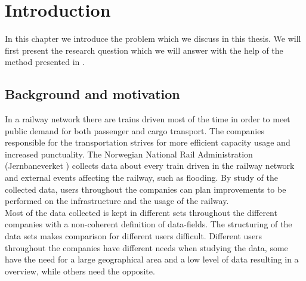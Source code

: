 
\chapter{Introduction}
\label{chapter:introduction}


In this chapter we introduce the problem which we discuss in this thesis.
We will first present the research question which we will answer with the help
of the method presented in  .

\section{Background and motivation} %
\label{sec:background_and_motivation}
In a railway network there are trains driven most of the time in order to meet
public demand for both passenger and cargo transport. The companies
responsible for the transportation strives for more efficient capacity usage
and increased punctuality. The Norwegian National Rail Administration 
(Jernbaneverket \cite{jernbaneverketAbout}) collects data about every train
driven in the railway network and external events affecting the railway, such 
as flooding. By study of the collected data, users throughout the companies can
plan improvements to be performed on the infrastructure and the usage of the
railway.\\

Most of the data collected is kept in different sets throughout the different
companies with a non-coherent definition of data-fields. The structuring of 
the data sets makes comparison for different users difficult. Different users
throughout the companies have different needs when studying the data, some have
the need for a large geographical area and a low level of data resulting in a
overview, while others need the opposite. \\

